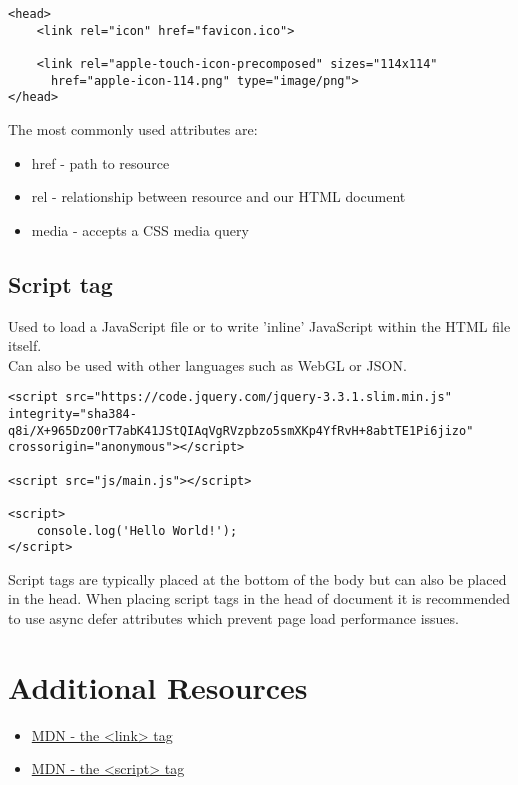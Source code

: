 \begin{verbatim}
<head>
    <link rel="icon" href="favicon.ico">

    <link rel="apple-touch-icon-precomposed" sizes="114x114"
      href="apple-icon-114.png" type="image/png">
</head>
\end{verbatim}

The most commonly used attributes are:

\begin{itemize}[leftmargin=*]
    \item href - path to resource
    \item rel - relationship between resource and our HTML document
    \item media - accepts a CSS media query
\end{itemize}

\subsection{Script tag}

Used to load a JavaScript file or to write 'inline' JavaScript within the HTML file itself.
\\

Can also be used with other languages such as WebGL or JSON.

\begin{verbatim}
<script src="https://code.jquery.com/jquery-3.3.1.slim.min.js" integrity="sha384-q8i/X+965DzO0rT7abK41JStQIAqVgRVzpbzo5smXKp4YfRvH+8abtTE1Pi6jizo" crossorigin="anonymous"></script>

<script src="js/main.js"></script>

<script>
    console.log('Hello World!');
</script>
\end{verbatim}

Script tags are typically placed at the bottom of the body but can also be placed in the head. When placing script tags in the head of document it is recommended to use async defer attributes which prevent page load performance issues.

\section{Additional Resources}

\begin{itemize}[leftmargin=*]
    \item \href{https://developer.mozilla.org/en-US/docs/Web/HTML/Element/link}{MDN - the <link> tag}
    \item \href{https://developer.mozilla.org/en-US/docs/Web/HTML/Element/script}{MDN - the <script> tag}
\end{itemize}